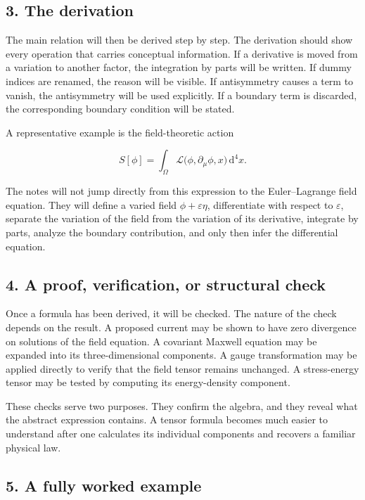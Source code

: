 \subsection*{3. The derivation}

The main relation will then be derived step by step. The derivation should show every operation that carries conceptual information. If a derivative is moved from a variation to another factor, the integration by parts will be written. If dummy indices are renamed, the reason will be visible. If antisymmetry causes a term to vanish, the antisymmetry will be used explicitly. If a boundary term is discarded, the corresponding boundary condition will be stated.

A representative example is the field-theoretic action

\[
S[\phi]
=
\int_{\Omega}
\mathcal{L}\bigl(\phi,\partial_{\mu}\phi,x\bigr)
\,\mathrm{d}^{4}x.
\]

The notes will not jump directly from this expression to the Euler--Lagrange field equation. They will define a varied field \(\phi+\varepsilon\eta\), differentiate with respect to \(\varepsilon\), separate the variation of the field from the variation of its derivative, integrate by parts, analyze the boundary contribution, and only then infer the differential equation.

\subsection*{4. A proof, verification, or structural check}

Once a formula has been derived, it will be checked. The nature of the check depends on the result. A proposed current may be shown to have zero divergence on solutions of the field equation. A covariant Maxwell equation may be expanded into its three-dimensional components. A gauge transformation may be applied directly to verify that the field tensor remains unchanged. A stress-energy tensor may be tested by computing its energy-density component.

These checks serve two purposes. They confirm the algebra, and they reveal what the abstract expression contains. A tensor formula becomes much easier to understand after one calculates its individual components and recovers a familiar physical law.

\subsection*{5. A fully worked example}


